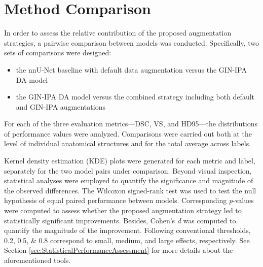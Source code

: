 \section{Method Comparison} \label{sec:MethodComparison}
In order to assess the relative contribution of the proposed augmentation strategies, a pairwise comparison between models was conducted. Specifically, two sets of comparisons were designed:
\begin{itemize}
    \item the nnU-Net baseline with default data augmentation versus the GIN-IPA DA model
    \item the GIN-IPA DA model versus the combined strategy including both default and GIN-IPA augmentations
\end{itemize}
For each of the three evaluation metrics---DSC, VS, and HD95---the distributions of performance values were analyzed. Comparisons were carried out both at the level of individual anatomical structures and for the total average across labels.

Kernel density estimation (KDE) plots were generated for each metric and label, separately for the two model pairs under comparison. Beyond visual inspection, statistical analyses were employed to quantify the significance and magnitude of the observed differences. The Wilcoxon signed-rank test was used to test the null hypothesis of equal paired performance between models. Corresponding \textit{p}-values were computed to assess whether the proposed augmentation strategy led to statistically significant improvements. Besides, Cohen's \textit{d} was computed to quantify the magnitude of the improvement. Following conventional thresholds, \numlist{0.2; 0.5; 0.8} correspond to small, medium, and large effects, respectively. See Section \ref{sec:StatisticalPerformanceAssessment} for more details about the aforementioned tools.

